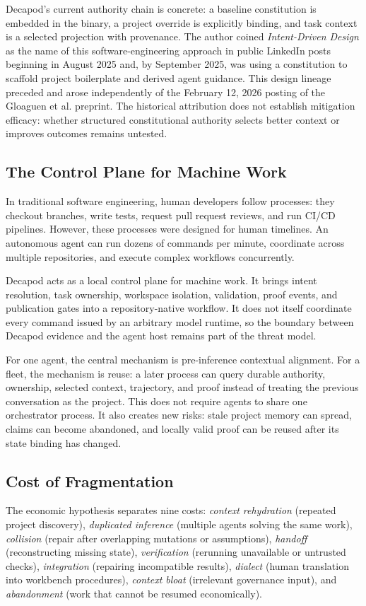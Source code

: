 Decapod's current authority chain is concrete: a baseline constitution is embedded in the binary, a project override is explicitly binding, and task context is a selected projection with provenance. The author coined \emph{Intent-Driven Design} as the name of this software-engineering approach in public LinkedIn posts beginning in August 2025 and, by September 2025, was using a constitution to scaffold project boilerplate and derived agent guidance. This design lineage preceded and arose independently of the February 12, 2026 posting of the Gloaguen et al. preprint. The historical attribution does not establish mitigation efficacy: whether structured constitutional authority selects better context or improves outcomes remains untested.

\subsection{The Control Plane for Machine Work}
In traditional software engineering, human developers follow processes: they checkout branches, write tests, request pull request reviews, and run CI/CD pipelines. However, these processes were designed for human timelines. An autonomous agent can run dozens of commands per minute, coordinate across multiple repositories, and execute complex workflows concurrently.

Decapod acts as a local control plane for machine work. It brings intent resolution, task ownership, workspace isolation, validation, proof events, and publication gates into a repository-native workflow. It does not itself coordinate every command issued by an arbitrary model runtime, so the boundary between Decapod evidence and the agent host remains part of the threat model.

For one agent, the central mechanism is pre-inference contextual alignment. For a fleet, the mechanism is reuse: a later process can query durable authority, ownership, selected context, trajectory, and proof instead of treating the previous conversation as the project. This does not require agents to share one orchestrator process. It also creates new risks: stale project memory can spread, claims can become abandoned, and locally valid proof can be reused after its state binding has changed.

\subsection{Cost of Fragmentation}
The economic hypothesis separates nine costs: \emph{context rehydration} (repeated project discovery), \emph{duplicated inference} (multiple agents solving the same work), \emph{collision} (repair after overlapping mutations or assumptions), \emph{handoff} (reconstructing missing state), \emph{verification} (rerunning unavailable or untrusted checks), \emph{integration} (repairing incompatible results), \emph{dialect} (human translation into workbench procedures), \emph{context bloat} (irrelevant governance input), and \emph{abandonment} (work that cannot be resumed economically).

